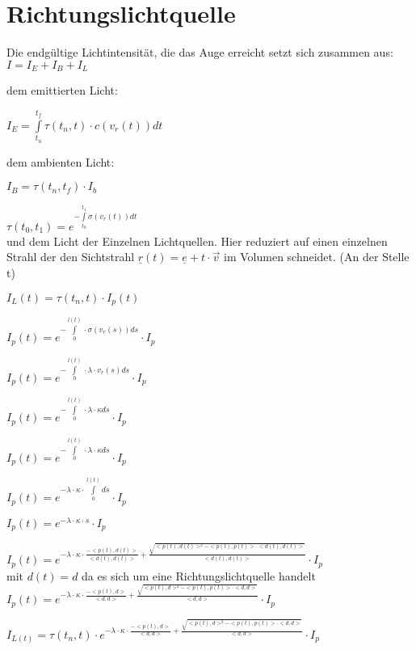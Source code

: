 \documentclass[]{article}
\begin{document}
\section{Richtungslichtquelle}

Die endgültige Lichtintensität, die das Auge erreicht setzt sich zusammen aus: \\
 
$I = I_E + I_B + I_L$

dem emittierten Licht:

$I_E = \int\limits_{t_n}^{t_f} \tau(t_n, t) \cdot c(v_r(t)) dt $

dem ambienten Licht:

$I_B = \tau(t_n, t_f) \cdot I_b$

$\tau(t_0, t_1) = e^{- \int\limits_{t_0}^{t_1} \sigma (v_r(t)) dt}$ \\

und dem Licht der Einzelnen Lichtquellen. Hier reduziert auf einen einzelnen Strahl der den Sichtstrahl $\underline{r}(t) = \underline{e} + t \cdot \vec{v}$ im Volumen schneidet. (An der Stelle t)

$I_L(t) = \tau(t_n, t) \cdot I_p(t)$

$I_p(t) = e^{- \int\limits_{0}^{l(t)} \cdot  \sigma (v_r(s)) ds} \cdot I_p$

$I_p(t) = e^{- \int\limits_{0}^{l(t)} \cdot  \lambda \cdot v_r(s) ds} \cdot I_p$

$I_p(t) = e^{- \int\limits_{0}^{l(t)} \cdot  \lambda \cdot \kappa ds} \cdot I_p$

$I_p(t) = e^{- \int\limits_{0}^{l(t)} \cdot  \lambda \cdot \kappa ds} \cdot I_p$

$I_p(t) = e^{- \lambda \cdot \kappa \cdot \int\limits_{0}^{l(t)} ds} \cdot I_p$

$I_p(t) = e^{- \lambda \cdot \kappa \cdot s} \cdot I_p$

$I_p(t) = e^{- \lambda \cdot \kappa \cdot \frac{-<p(t), d(t)>}{<d(t), d(t)>} + \frac{\sqrt{<p(t), d(t)>^2 - <p(t), p(t)> \cdot <d(t), d(t)>}}{<d(t), d(t)>}} \cdot I_p$ \\

mit $d(t) = d$ da es sich um eine Richtungslichtquelle handelt \\

$I_p(t) = e^{- \lambda \cdot \kappa \cdot \frac{-<p(t), d>}{<d, d>} + \frac{\sqrt{<p(t), d>^2 - <p(t), p(t)> \cdot <d, d>}}{<d, d>}} \cdot I_p$

$I_{L(t)} = \tau(t_n, t) \cdot e^{- \lambda \cdot \kappa \cdot \frac{-<p(t), d>}{<d, d>} + \frac{\sqrt{<p(t), d>^2 - <p(t), p(t)> \cdot <d, d>}}{<d, d>}} \cdot I_p$ \\
\end{document}

